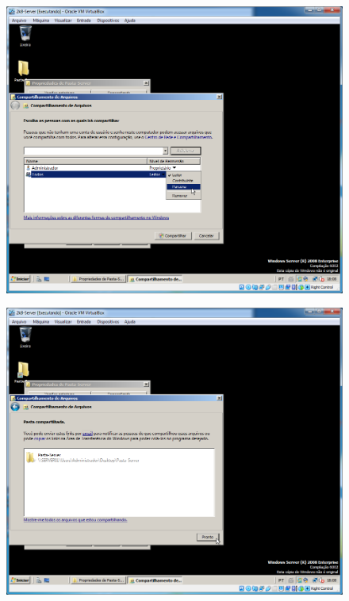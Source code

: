 \documentclass[10pt]{article}
\begin{document}
\begin{figure}[H]
    \centering
    \caption{}
    \label{fig:5117}
    \includegraphics[width=\linewidth]{images/windows_server/compartilhamento/008.png}
\end{figure}
\begin{figure}[H]
    \centering
    \caption{}
    \label{fig:5118}
    \includegraphics[width=\linewidth]{images/windows_server/compartilhamento/010.png}
\end{figure}
\end{document}
